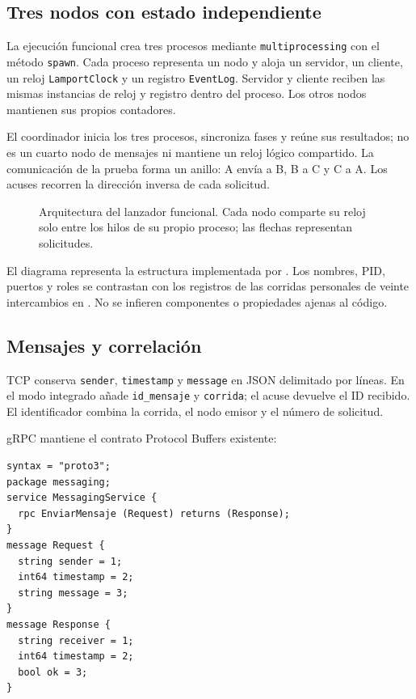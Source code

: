 \subsection{Tres nodos con estado independiente}
La ejecución funcional crea tres procesos mediante \texttt{multiprocessing}
con el método \texttt{spawn}. Cada proceso representa un nodo y aloja un
servidor, un cliente, un reloj \texttt{LamportClock} y un registro
\texttt{EventLog}. Servidor y cliente reciben las mismas instancias de reloj
y registro dentro del proceso. Los otros nodos mantienen sus propios contadores.

El coordinador inicia los tres procesos, sincroniza fases y reúne sus resultados;
no es un cuarto nodo de mensajes ni mantiene un reloj lógico compartido.
La comunicación de la prueba forma un anillo: A envía a B, B a C y C a A.
Los acuses recorren la dirección inversa de cada solicitud.

\begin{figure}[htbp]
\centering

\caption{Arquitectura del lanzador funcional. Cada nodo comparte su reloj solo
entre los hilos de su propio proceso; las flechas representan solicitudes.}
\label{fig:arquitectura}
\end{figure}

El diagrama representa la estructura implementada por
. Los nombres, PID, puertos y roles
se contrastan con los registros de las corridas personales de veinte intercambios
en . No se infieren componentes o propiedades ajenas al código.

\subsection{Mensajes y correlación}
TCP conserva \texttt{sender}, \texttt{timestamp} y \texttt{message} en JSON
delimitado por líneas. En el modo integrado añade \texttt{id\_mensaje} y
\texttt{corrida}; el acuse devuelve el ID recibido. El identificador combina
la corrida, el nodo emisor y el número de solicitud.

gRPC mantiene el contrato Protocol Buffers existente:
\begin{lstlisting}
syntax = "proto3";
package messaging;
service MessagingService {
  rpc EnviarMensaje (Request) returns (Response);
}
message Request {
  string sender = 1;
  int64 timestamp = 2;
  string message = 3;
}
message Response {
  string receiver = 1;
  int64 timestamp = 2;
  bool ok = 3;
}
\end{lstlisting}

